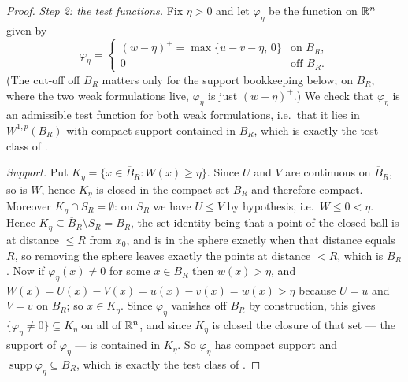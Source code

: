 \begin{proof}
\emph{Step 2: the test functions.}  Fix $\eta>0$ and let $\varphi_\eta$ be the
function on $\mathbb{R}^n$ given by
\[
\varphi_\eta=\begin{cases}
(w-\eta)^+=\max\{u-v-\eta,\,0\} & \text{on }B_R,\\
0 & \text{off }B_R .
\end{cases}
\]
(The cut-off off $B_R$ matters only for the support bookkeeping below; on $B_R$,
where the two weak formulations live, $\varphi_\eta$ is just $(w-\eta)^+$.)
We check that $\varphi_\eta$ is an admissible test function for both weak
formulations, i.e.\ that it lies in $W^{1,p}(B_R)$ with compact support contained
in $B_R$, which is exactly the test class of .

\emph{Support.}  Put $K_\eta=\{x\in\overline B_R:W(x)\ge\eta\}$.  Since $U$ and
$V$ are continuous on $\overline B_R$, so is $W$, hence $K_\eta$ is closed in the
compact set $\overline B_R$ and therefore compact.  Moreover
$K_\eta\cap S_R=\emptyset$: on $S_R$ we have $U\le V$ by hypothesis, i.e.\
$W\le0<\eta$.  Hence $K_\eta\subseteq\overline B_R\setminus S_R=B_R$, the set
identity being that a point of the closed ball is at distance $\le R$ from
$x_0$, and is in the sphere exactly when that distance equals $R$, so removing
the sphere leaves exactly the points at distance $<R$, which is $B_R$.  Now if
$\varphi_\eta(x)\ne0$ for
some $x\in B_R$ then $w(x)>\eta$, and $W(x)=U(x)-V(x)=u(x)-v(x)=w(x)>\eta$
because $U=u$ and $V=v$ on $B_R$; so $x\in K_\eta$.  Since $\varphi_\eta$
vanishes off $B_R$ by construction, this gives
$\{\varphi_\eta\ne0\}\subseteq K_\eta$ on all of $\mathbb{R}^n$, and since $K_\eta$ is
closed the closure of that set --- the support of $\varphi_\eta$ --- is contained
in $K_\eta$.  So $\varphi_\eta$ has compact support and
$\operatorname{supp}\varphi_\eta\subseteq B_R$, which is exactly the test class
of \noderef{IsWeakSolutionOn}.


\end{proof}
